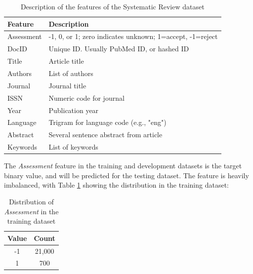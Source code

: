 \documentclass[11pt]{article}
\begin{document}
\begin{table}[!ht]
    \caption{Description of the features of the Systematic Review dataset}
    \begin{center}

        \begin{tabular}{| l | l |}
        \hline
        \textbf{Feature} & \textbf{Description}
        \\ \hline
        Assessment & -1, 0, or 1; zero indicates unknown; 1=accept, -1=reject
        \\ \hline
        DocID & Unique ID. Usually PubMed ID, or hashed ID
        \\ \hline
        Title & Article title
        \\ \hline
        Authors & List of authors
        \\ \hline
        Journal & Journal title
        \\ \hline
        ISSN & Numeric code for journal
        \\ \hline
        Year & Publication year
        \\ \hline
        Language & Trigram for language code (e.g., "eng")
        \\ \hline
        Abstract & Several sentence abstract from article
        \\ \hline
        Keywords & List of keywords
        \\ \hline
        \end{tabular}

    \end{center}

\end{table}

The \textit{Assessment} feature in the training and development datasets is the target binary value, and will be predicted for the testing dataset. The feature is heavily imbalanced, with Table \ref{table:dist_train} showing the distribution in the training dataset:

\begin{table}[!ht]
    \caption{Distribution of \textit{Assessment} in the training dataset}
    \label{table:dist_train}
    \begin{center}

        \begin{tabular}{| c | c |}
        \hline
        \textbf{Value} & \textbf{Count}
        \\ \hline
        -1 & 21,000
        \\ \hline
        1 & 700
        \\ \hline
        \end{tabular}

    \end{center}

\end{table}
\end{document}
